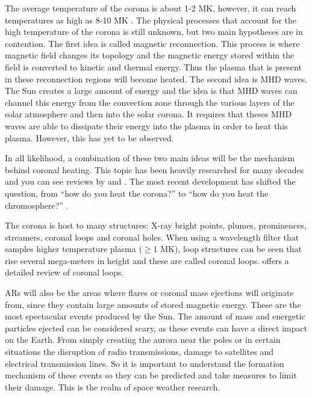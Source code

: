     The average temperature of the corona is about 1-2 MK, however, it can reach temperatures as high as 8-10 MK \citep{markus2004physics}.
	The physical processes that account for the high temperature of the corona is still unknown, but two main hypotheses are in contention.
    The first idea is called magnetic reconnection. 
    This process is where magnetic field changes its topology and the magnetic energy stored within the field is converted to kinetic and thermal energy.
    Thus the plasma that is present in these reconnection regions will become heated. 
    The second idea is MHD waves.
    The Sun creates a large amount of energy and the idea is that MHD waves can channel this energy from the convection zone through the various layers of the solar atmosphere and then into the solar corona.
	It requires that theses MHD waves are able to dissipate their energy into the plasma in order to heat this plasma.
	However, this has yet to be observed.
    
    In all likelihood, a combination of these two main ideas will be the mechanism behind coronal heating.
    This topic has been heavily researched for many decades and you can see reviews by \cite{erdelyi2004heating} and \cite{Parnell2012}.
    The most recent development has shifted the question, from ``how do you heat the corona?'' to ``how do you heat the chromosphere?'' \citep{Aschwanden2007}.
    
    The corona is host to many structures: X-ray bright points, plumes, prominences, streamers, coronal loops and coronal holes.
    When using a wavelength filter that samples higher temperature plasma ($\ge1$ MK), loop structures can be seen that rise several mega-meters in height and these are called coronal loops.
    \cite{2010LRSP....7....5R} offers a detailed review of coronal loops.
     
    ARs  will also be the areas where flares or coronal mass ejections will originate from, since they contain large amounts of stored magnetic energy.
    These are the most spectacular events produced by the Sun.
    The amount of mass and energetic particles ejected can be considered scary, as these events can have a direct impact on the Earth.
    From simply creating the aurora near the poles or in certain situations the disruption of radio transmissions, damage to satellites and electrical transmission lines.
    So it is important to understand the formation mechanism of these events so they can be predicted and take measures to limit their damage.
    This is the realm of space weather research. 
    
